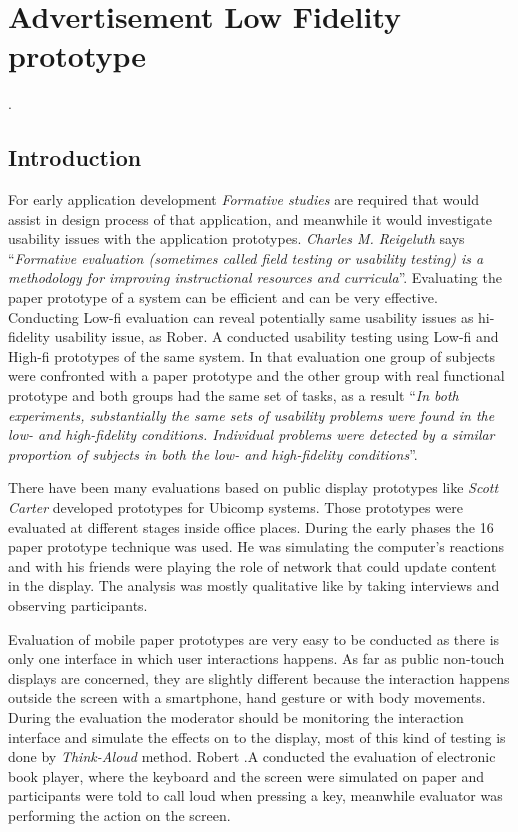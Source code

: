 \chapter{Advertisement Low Fidelity prototype} %

\label{Chapter5} %
\newpage
.
\newpage


\section{Introduction}
For early application development \emph{Formative studies} are required that would assist in design process of that application, and meanwhile it would investigate usability issues with the application prototypes. \emph{Charles M. Reigeluth} \cite{formativestudy} says ``\emph{Formative evaluation (sometimes called field testing or usability testing) is a methodology for improving instructional resources and curricula}''. Evaluating the paper prototype of a system can be efficient \cite{lowfidelityefficient} and can be very effective. Conducting Low-fi evaluation can reveal potentially same usability issues as hi-fidelity usability issue, as Rober. A \cite{usabilityproblems} conducted usability testing using Low-fi and High-fi prototypes of the same system. In that evaluation one group of subjects were confronted with a paper prototype and the other group with real functional prototype and both groups had the same set of tasks, as a result ``\emph{In both experiments, substantially the same sets of usability problems were found in the low- and high-fidelity conditions. Individual problems were detected by a similar proportion of subjects in both the low- and high-fidelity conditions}''. 

There have been many evaluations based on public display prototypes like \emph{Scott Carter} \cite{prototypetesting1} developed prototypes for Ubicomp systems. Those prototypes were evaluated at different stages inside office places. During the early phases the 16 paper prototype technique was used. He was simulating the computer’s reactions and with his friends were playing the role of network that could update content in the display. The analysis was mostly qualitative like by taking interviews and observing participants. 

Evaluation of mobile paper prototypes are very easy to be conducted as there is only one interface in which user interactions happens. As far as public non-touch displays are concerned, they are slightly different because the interaction happens outside the screen with a smartphone, hand gesture or with body movements. During the evaluation the moderator should be monitoring the interaction interface and simulate the effects on to the display, most of this kind of testing is done by \emph{Think-Aloud} method. Robert .A \cite{usabilityproblems} conducted the evaluation of electronic book player, where the keyboard and the screen were simulated on paper and participants were told to call loud when pressing a key, meanwhile evaluator was performing the action on the screen.

